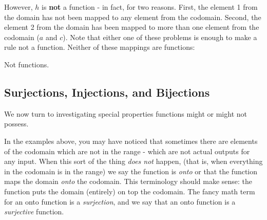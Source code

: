 \documentclass[12pt]{article}
\begin{document}
\begin{example}
\begin{solution}
  However, $h$ is \textbf{not} a function - in fact, for two reasons.  First, the element 1 from the domain has not been mapped to any element from the codomain.  Second, the element 2 from the domain has been mapped to more than one element from the codomain ($a$ and $c$).  Note that either one of these problems is enough to make a rule not a function.  Neither of these mappings are functions:
  \begin{center}
    \begin{multicols}{2}
       

    \end{multicols}
  Not functions.
  \end{center}

\end{solution}

\end{example}

\subsection{Surjections, Injections, and Bijections}

We now turn to investigating special properties functions might or might not possess.  

In the examples above, you may have noticed that sometimes there are elements of the codomain which are not in the range - which are not actual outputs for any input.  When this sort of the thing {\em does not} happen, (that is, when everything in the codomain is in the range) we say the function is {\em onto} or that the function maps the domain {\em onto} the codomain.  This terminology should make sense: the function puts the domain (entirely) on top the codomain.  The fancy math term for an onto function is a {\em surjection}, and we say that an onto function is a {\em surjective} function.
\end{document}
